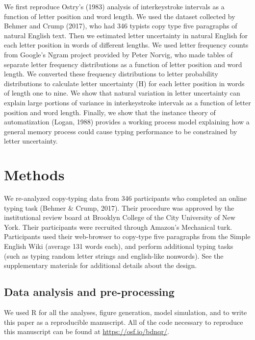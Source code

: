 \documentclass[,man,floatsintext]{apa6}
\begin{document}
We first reproduce Ostry's (1983) analysis of interkeystroke intervals as a function of letter position and word length. We used the dataset collected by Behmer and Crump (2017), who had 346 typists copy type five paragraphs of natural English text. Then we estimated letter uncertainty in natural English for each letter position in words of different lengths. We used letter frequency counts from Google's Ngram project provided by Peter Norvig, who made tables of separate letter frequency distributions as a function of letter position and word length. We converted these frequency distributions to letter probability distributions to calculate letter uncertainty (H) for each letter position in words of length one to nine. We show that natural variation in letter uncertainty can explain large portions of variance in interkeystroke intervals as a function of letter position and word length. Finally, we show that the instance theory of automatization (Logan, 1988) provides a working process model explaining how a general memory process could cause typing performance to be constrained by letter uncertainty.

\hypertarget{methods}{%
\section{Methods}\label{methods}}

We re-analyzed copy-typing data from 346 participants who completed an online typing task (Behmer \& Crump, 2017). Their procedure was approved by the institutional review board at Brooklyn College of the City University of New York. Their participants were recruited through Amazon's Mechanical turk. Participants used their web-browser to copy-type five paragraphs from the Simple English Wiki (average 131 words each), and perform additional typing tasks (such as typing random letter strings and english-like nonwords). See the supplementary materials for additional details about the design.

\hypertarget{data-analysis-and-pre-processing}{%
\subsection{Data analysis and pre-processing}\label{data-analysis-and-pre-processing}}

We used R for all the analyses, figure generation, model simulation, and to write this paper as a reproducible manuscript. All of the code necessary to reproduce this manuscript can be found at \url{https://osf.io/bdnqr/}.
\end{document}
